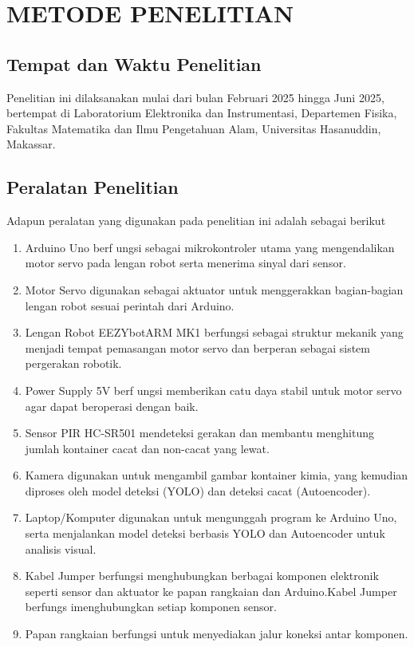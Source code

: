 \chapter{METODE PENELITIAN}
\section{Tempat dan Waktu Penelitian}
Penelitian ini dilaksanakan mulai dari bulan Februari 2025 hingga Juni
2025, bertempat di Laboratorium Elektronika dan Instrumentasi,
Departemen Fisika, Fakultas Matematika dan Ilmu Pengetahuan Alam,
Universitas Hasanuddin, Makassar.

\vspace{1em}

\section{Peralatan Penelitian}
Adapun peralatan yang digunakan pada penelitian ini adalah sebagai berikut
\begin{enumerate}
  \item Arduino Uno berf ungsi sebagai mikrokontroler utama yang
    mengendalikan motor servo pada lengan robot serta menerima sinyal
    dari sensor.
  \item Motor Servo digunakan sebagai aktuator untuk menggerakkan
    bagian-bagian lengan robot sesuai perintah dari Arduino.
  \item Lengan Robot EEZYbotARM MK1 berfungsi sebagai struktur
    mekanik yang menjadi tempat pemasangan motor servo dan berperan
    sebagai sistem pergerakan robotik.
  \item Power Supply 5V berf ungsi memberikan catu daya stabil untuk
    motor servo agar dapat beroperasi dengan baik.
  \item Sensor PIR HC-SR501 mendeteksi gerakan dan membantu
    menghitung jumlah kontainer cacat dan non-cacat yang lewat.
  \item Kamera digunakan untuk mengambil gambar kontainer kimia, yang
    kemudian diproses oleh model deteksi (YOLO) dan deteksi cacat (Autoencoder).
  \item Laptop/Komputer digunakan untuk mengunggah program ke Arduino
    Uno, serta menjalankan model deteksi berbasis YOLO dan
    Autoencoder untuk analisis visual.
  \item Kabel Jumper berfungsi menghubungkan berbagai komponen
    elektronik seperti sensor dan aktuator ke papan rangkaian dan
    Arduino.Kabel Jumper berfungs imenghubungkan setiap komponen sensor.
  \item Papan rangkaian berfungsi untuk menyediakan jalur koneksi
    antar komponen.
\end{enumerate}

